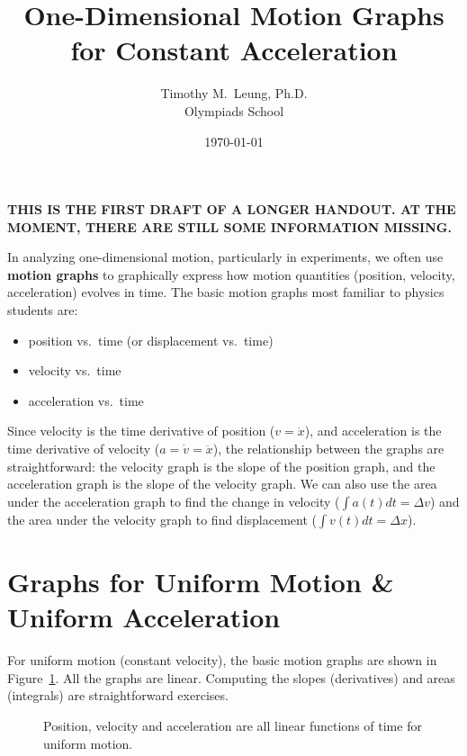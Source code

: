 \documentclass[11pt]{article}
\title{One-Dimensional Motion Graphs for Constant Acceleration}
\author{Timothy M.\ Leung, Ph.D.\\Olympiads School}
\date{\today}
\begin{document}
\maketitle

\textbf{THIS IS THE FIRST DRAFT OF A LONGER HANDOUT. AT THE MOMENT, THERE ARE
  STILL SOME INFORMATION MISSING.}

In analyzing one-dimensional motion, particularly in experiments, we often use
\textbf{motion graphs} to graphically express how motion quantities (position,
velocity, acceleration) evolves in time. The basic motion graphs most familiar
to physics students are:
\begin{itemize}[noitemsep,topsep=0pt,leftmargin=15pt]
\item position vs.\ time (or displacement vs.\ time)
\item velocity vs.\ time
\item acceleration vs.\ time
\end{itemize}
Since velocity is the time derivative of position ($v=\dot{x}$), and
acceleration is the time derivative of velocity ($a=\dot{v}=\ddot{x}$), the
relationship between the graphs are straightforward: the velocity graph is the
slope of the position graph, and the acceleration graph is the slope of the
velocity graph. We can also use the area under the acceleration graph to find
the change in velocity ($\int a(t)dt=\Delta v$) and the area under the velocity
graph to find displacement ($\int v(t)dt=\Delta x$).

\section{Graphs for Uniform Motion \& Uniform Acceleration}
For uniform motion (constant velocity), the basic motion graphs are shown in
Figure~\ref{uniform-motion}. All the graphs are linear. Computing the slopes
(derivatives) and areas (integrals) are straightforward exercises.
\begin{figure}[!ht]
  \centering
  \hspace{.15in}
  \hspace{.15in}
  \caption{Position, velocity and acceleration are all linear functions of time
    for uniform motion.}
  \label{uniform-motion}
\end{figure}
\end{document}
